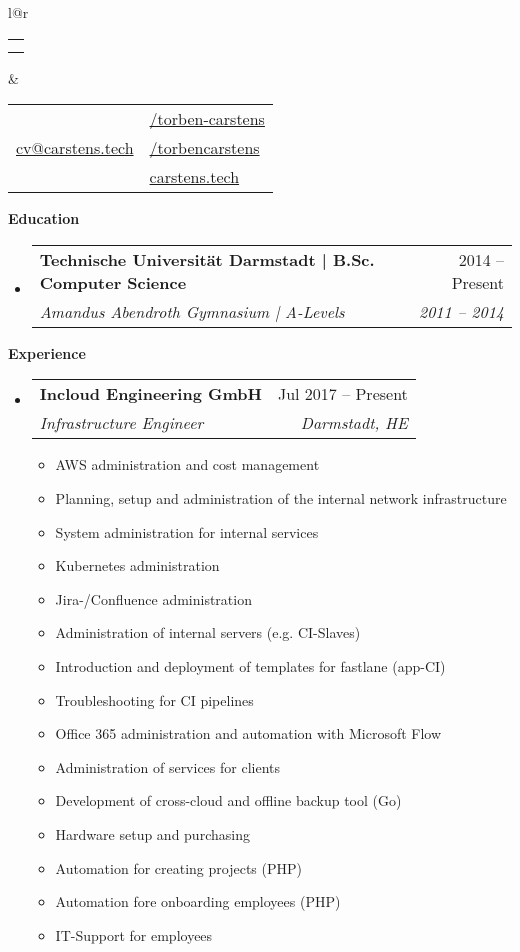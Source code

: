 \documentclass[letterpaper,12pt]{article}[leftmargin=*]
\makeatletter
\def \fullname {Torben Carstens}
\def \subtitle {}
\def \linkedinicon {\faLinkedin}
\def \linkedinlink {https://www.linkedin.com/in/torben-carstens-623685116/}
\def \linkedintext {/torben-carstens}
\def \phoneicon {\faPhone}
\def \phonetext {+49 1516 1447011}
\def \emailicon {\faEnvelope}
\def \emaillink {mailto:cv@carstens.tech}
\def \emailtext {cv@carstens.tech}
\def \githubicon {\faGithub}
\def \githublink {https://github.com/torbencarstens}
\def \githubtext {/torbencarstens}
\def \websiteicon {\faGlobe}
\def \websitelink {https://carstens.tech/}
\def \websitetext {carstens.tech}
\def \headertype {\doublecol} %
\def \entryspacing {-0pt}
\def \linkedin {\linkedinicon \hspace{3pt}\href{\linkedinlink}{\linkedintext}}
\def \phone {\phoneicon \hspace{3pt}{ \phonetext}}
\def \email {\emailicon \hspace{3pt}\href{\emaillink}{\emailtext}}
\def \github {\githubicon \hspace{3pt}\href{\githublink}{\githubtext}}
\def \website {\websiteicon \hspace{3pt}\href{\websitelink}{\websitetext}}
\renewcommand{\section}[2]{\vspace{5pt}
  \colorbox{secondary}{\color{white}\raggedbottom\normalsize\textbf{{#1}{\hspace{7pt}#2}}}
}
\newcommand{\resumeEntryStart}{\begin{itemize}[leftmargin=2.5mm]}
\newcommand{\resumeEntryEnd}{\end{itemize}\vspace{\entryspacing}}
\newcommand{\resumeItemListStart}{\begin{itemize}[leftmargin=4.5mm]}
\newcommand{\resumeItemListEnd}{\end{itemize}}
\newcommand{\resumeItem}[1]{
  \item\small{
    {#1 \vspace{-2pt}}
  }
}
\newcommand{\resumeEntryTSDL}[4]{
  \vspace{-1pt}\item[]
    \begin{tabular*}{0.97\textwidth}{l@{\extracolsep{\fill}}r}
      \textbf{\color{primary}#1} & {\firabook\color{accent}\small#2} \\
      \textit{\color{accent}\small#3} & \textit{\color{accent}\small#4} \\
    \end{tabular*}\vspace{-6pt}
}
\newcommand{\doublecol}[6]{
  \begin{tabular*}{\textwidth}{l@{\extracolsep{\fill}}r}
    {
      \begin{tabular}[c]{l}
        \fontsize{35}{45}\selectfont{\color{primary}{{\textbf{\fullname}}}} \\
        {\textit{\subtitle}} %
      \end{tabular}
    } & {
      \begin{tabular}[c]{l@{\hspace{1.5em}}l}
        {\small#4} & {\small#1} \\
        {\small#5} & {\small#2} \\
        {\small#6} & {\small#3}
      \end{tabular}
    }
  \end{tabular*}
}
\newcommand{\singlecol}[6]{
  \begin{tabular*}{\textwidth}{l@{\extracolsep{\fill}}r}
    {
      \begin{tabular}[b]{l}
        \fontsize{35}{45}\selectfont{\color{primary}{{\textbf{\fullname}}}} \\
        {\textit{\subtitle}} %
      \end{tabular}
    } & {
      \begin{tabular}[c]{l}
        {\small#1} \\
        {\small#2} \\
        {\small#3} \\
        {\small#4} \\
        {\small#5} \\
        {\small#6}
      \end{tabular}
    }
  \end{tabular*}
}
\makeatother
\begin{document}


\headertype{\linkedin}{\github}{\website}{\phone}{\email}{} %
\vspace{-10pt} %

\section{\faGraduationCap}{Education}

  \resumeEntryStart
    \resumeEntryTSDL
      {Technische Universit{\"a}t Darmstadt | B.Sc. Computer Science}{2014 -- Present}
      {Amandus Abendroth Gymnasium | A-Levels}{2011 -- 2014}
  \resumeEntryEnd

\section{\faPieChart}{Experience}

  \resumeEntryStart
    \resumeEntryTSDL
      {Incloud Engineering GmbH}{Jul 2017 -- Present}
      {Infrastructure Engineer}{Darmstadt, HE}
    \resumeItemListStart
        \resumeItem {AWS administration and cost management}
        \resumeItem {Planning, setup and administration of the internal network infrastructure}
        \resumeItem {System administration for internal services}
        \resumeItem {Kubernetes administration}
        \resumeItem {Jira-/Confluence administration}
        \resumeItem {Administration of internal servers (e.g. CI-Slaves)}
        \resumeItem {Introduction and deployment of templates for fastlane (app-CI)}
        \resumeItem {Troubleshooting for CI pipelines}
        \resumeItem {Office 365 administration and automation with Microsoft Flow}
        \resumeItem {Administration of services for clients}
        \resumeItem {Development of cross-cloud and offline backup tool (Go)}
        \resumeItem {Hardware setup and purchasing}
        \resumeItem {Automation for creating projects (PHP)}
        \resumeItem {Automation fore onboarding employees (PHP)}
        \resumeItem {IT-Support for employees}
    \resumeItemListEnd
  \resumeEntryEnd
\end{document}
